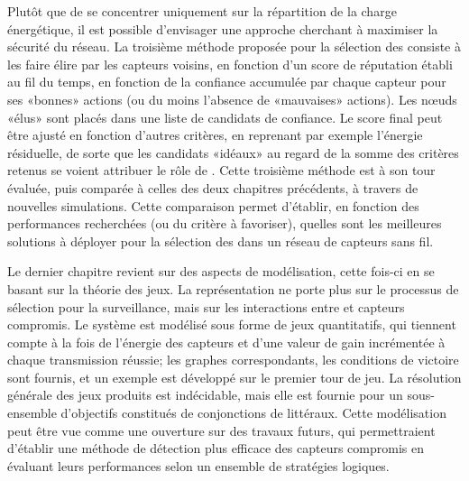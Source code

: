 Plutôt que de se concentrer uniquement sur la répartition de la charge énergétique, il est possible d'envisager une approche cherchant à maximiser la sécurité du réseau.
La troisième méthode proposée pour la sélection des \cnst consiste à les faire élire par les capteurs voisins, en fonction d'un score de réputation établi au fil du temps, \cad en fonction de la confiance accumulée par chaque capteur pour ses «bonnes» actions (ou du moins l'absence de «mauvaises» actions).
Les nœuds «élus» sont placés dans une liste de candidats de confiance.
Le score final peut être ajusté en fonction d'autres critères, en reprenant par exemple l'énergie résiduelle, de sorte que les candidats «idéaux» au regard de la somme des critères retenus se voient attribuer le rôle de \cnt.
Cette troisième méthode est à son tour évaluée, puis comparée à celles des deux chapitres précédents, à travers de nouvelles simulations.
Cette comparaison permet d'établir, en fonction des performances recherchées (ou du critère à favoriser), quelles sont les meilleures solutions à déployer pour la sélection des \cnst dans un réseau de capteurs sans fil.

Le dernier chapitre revient sur des aspects de modélisation, cette fois-ci en se basant sur la théorie des jeux.
La représentation ne porte plus sur le processus de sélection pour la surveillance, mais sur les interactions entre \cnst et capteurs compromis.
Le système est modélisé sous forme de jeux quantitatifs, qui tiennent compte à la fois de l'énergie des capteurs et d'une valeur de gain incrémentée à chaque transmission réussie; les graphes correspondants, les conditions de victoire sont fournis, et un exemple est développé sur le premier tour de jeu.
La résolution générale des jeux produits est indécidable, mais elle est fournie pour un sous-ensemble d'objectifs constitués de conjonctions de littéraux.
Cette modélisation peut être vue comme une ouverture sur des travaux futurs, qui permettraient d'établir une méthode de détection plus efficace des capteurs compromis en évaluant leurs performances selon un ensemble de stratégies logiques.
